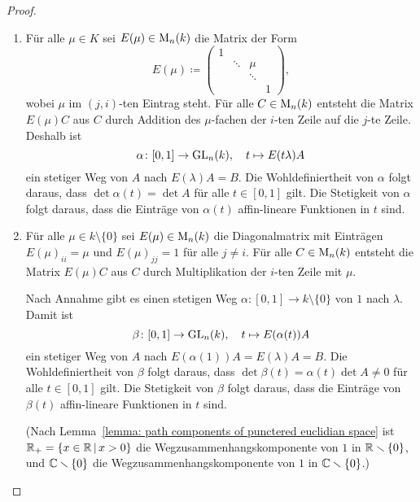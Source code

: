\begin{proof}
  \begin{enumerate}[label = \alph*)]
    \item
      Für alle $\mu \in K$ sei $E(\mu) \in \operatorname{M}_{n}(k)$ die Matrix der Form
      \[
                  E(\mu)
        \coloneqq \begin{pmatrix}
                    1 &         &         &   \\
                      & \ddots  & \mu     &   \\
                      &         & \ddots  &   \\
                      &         &         & 1
                  \end{pmatrix},
      \]
      wobei $\mu$ im $(j,i)$-ten Eintrag steht.
      Für alle $C \in \operatorname{M}_{n}(k)$ entsteht die Matrix $E(\mu) C$ aus $C$ durch Addition des $\mu$-fachen der $i$-ten Zeile auf die $j$-te Zeile.
      Deshalb ist
      \[
                \alpha
        \colon  [0,1] \to \operatorname{GL}_{n}(k),
        \quad   t
        \mapsto E(t\lambda) A
      \]
      ein stetiger Weg von $A$ nach $E(\lambda) A = B$.
      Die Wohldefiniertheit von $\alpha$ folgt daraus, dass $\det \alpha(t) = \det A$ für alle $t \in [0,1]$ gilt.
      Die Stetigkeit von $\alpha$ folgt daraus, dass die Einträge von $\alpha(t)$ affin-lineare Funktionen in $t$ sind.
      
    \item
      Für alle $\mu \in k \setminus \{0\}$ sei $E(\mu) \in \operatorname{M}_{n}(k)$ die Diagonalmatrix mit Einträgen $E(\mu)_{ii} = \mu$ und $E(\mu)_{jj} = 1$ für alle $j \neq i$.
      Für alle $C \in \operatorname{M}_{n}(k)$ entsteht die Matrix $E(\mu) C$ aus $C$ durch Multiplikation der $i$-ten Zeile mit $\mu$.
      
      Nach Annahme gibt es einen stetigen Weg $\alpha \colon [0,1] \to k \setminus \{0\}$ von $1$ nach $\lambda$.
      Damit ist
      \[
                \beta
        \colon  [0,1] \to \operatorname{GL}_{n}(k),
        \quad   t
        \mapsto E(\alpha(t)) A
      \]
      ein stetiger Weg von $A$ nach $E(\alpha(1)) A = E(\lambda) A = B$.
      Die Wohldefiniertheit von $\beta$ folgt daraus, dass $\det \beta(t) = \alpha(t) \det A \neq 0$ für alle $t \in [0,1]$ gilt.
      Die Stetigkeit von $\beta$ folgt daraus, dass die Einträge von $\beta(t)$ affin-lineare Funktionen in $t$ sind.
      
      (Nach Lemma~\ref{lemma: path components of punctered euclidian space} ist $\mathbb{R}_+ = \{x \in \mathbb{R} \,|\, x > 0\}$ die Wegzusammenhangskomponente von $1$ in $\mathbb{R} \smallsetminus \{0\}$, und $\mathbb{C} \smallsetminus \{0\}$ die Wegzusammenhangskomponente von $1$ in $\mathbb{C} \smallsetminus \{0\}$.)
    

\end{enumerate}
\end{proof}
